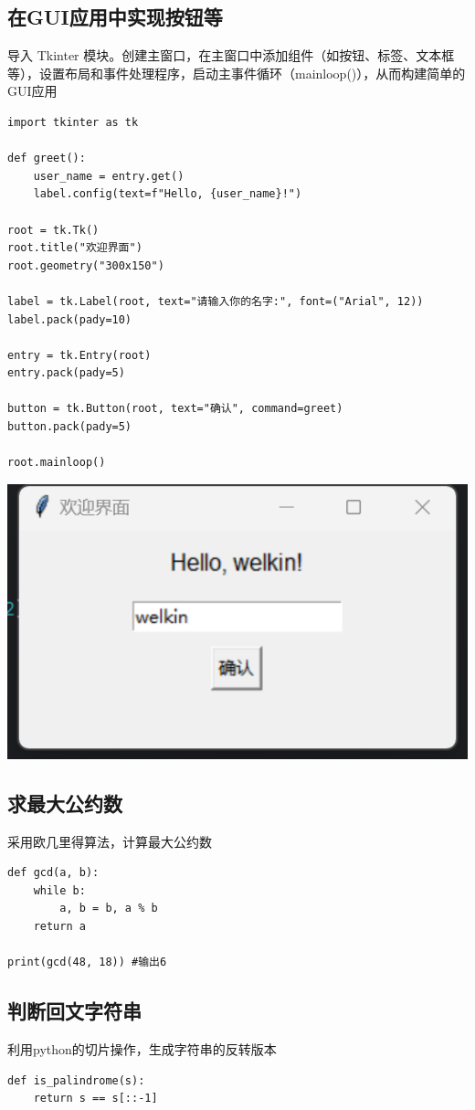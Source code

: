 \documentclass[UTF8,a4paper]{ctexart}
\begin{document}
\begin{sloppypar}
	\subsection{在GUI应用中实现按钮等}
	导入 Tkinter 模块。创建主窗口，在主窗口中添加组件（如按钮、标签、文本框等），设置布局和事件处理程序，启动主事件循环（mainloop()），从而构建简单的GUI应用
	\begin{lstlisting}
import tkinter as tk

def greet():
    user_name = entry.get()
    label.config(text=f"Hello, {user_name}!")

root = tk.Tk()
root.title("欢迎界面")
root.geometry("300x150")

label = tk.Label(root, text="请输入你的名字:", font=("Arial", 12))
label.pack(pady=10)

entry = tk.Entry(root)
entry.pack(pady=5)

button = tk.Button(root, text="确认", command=greet)
button.pack(pady=5)

root.mainloop()
	\end{lstlisting}
	
	\includegraphics[width = 16cm]{13}
	
\subsection{求最大公约数}
	采用欧几里得算法，计算最大公约数
\begin{lstlisting}
def gcd(a, b):
    while b:
        a, b = b, a % b
    return a

print(gcd(48, 18)) #输出6
\end{lstlisting}


\subsection{判断回文字符串}
	利用python的切片操作，生成字符串的反转版本
\begin{lstlisting}
def is_palindrome(s):
    return s == s[::-1]


\end{lstlisting}
\end{sloppypar}
\end{document}
